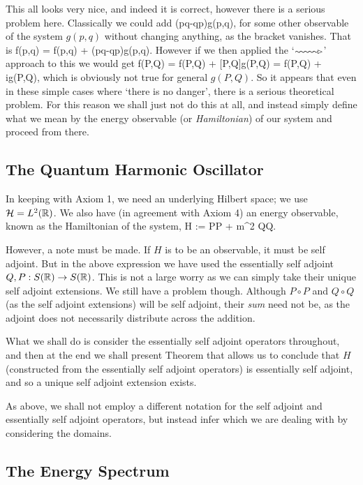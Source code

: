 This all looks very nice, and indeed it is correct, however there is a serious problem here. Classically we could add 
\bse 
(pq-qp)g(p,q),
\ese 
for some other observable of the system $g(p,q)$ without changing anything, as the bracket vanishes. That is 
\bse 
f(p,q) = f(p,q) + (pq-qp)g(p,q).
\ese 
However if we then applied the `$\squiggle$' approach to this we would get 
\bse 
f(P,Q) = f(P,Q) + [P,Q]g(P,Q) = f(P,Q) + i\hbar g(P,Q),
\ese 
which is obviously not true for general $g(P,Q)$. So it appears that even in these simple cases where `there is no danger', there is a serious theoretical problem. For this reason we shall just not do this at all, and instead simply define what we mean by the energy observable (or \emph{Hamiltonian}) of our system and proceed from there. 

\subsection{The Quantum Harmonic Oscillator}
In keeping with Axiom 1, we need an underlying Hilbert space; we use $\mathcal{H}=L^2(\mathbb{R})$. We also have (in agreement with Axiom 4) an energy observable, known as the Hamiltonian of the system,
\bse 
H := P\circ P + m\omega^2 Q\circ Q.
\ese 

However, a note must be made. If $H$ is to be an observable, it must be self adjoint. But in the above expression we have used the essentially self adjoint $Q,P:S(\mathbb{R})\to S(\mathbb{R})$. This is not a large worry as we can simply take their unique self adjoint extensions. We still have a problem though. Although $P\circ P$ and $Q\circ Q$ (as the self adjoint extensions) will be self adjoint, their \emph{sum} need not be, as the adjoint does not necessarily distribute across the addition. 

What we shall do is consider the essentially self adjoint operators throughout, and then at the end we shall present Theorem that allows us to conclude that $H$ (constructed from the essentially self adjoint operators) is essentially self adjoint, and so a unique self adjoint extension exists. 

As above, we shall not employ a different notation for the self adjoint and essentially self adjoint operators, but instead infer which we are dealing with by considering the domains. 

\subsection{The Energy Spectrum}

